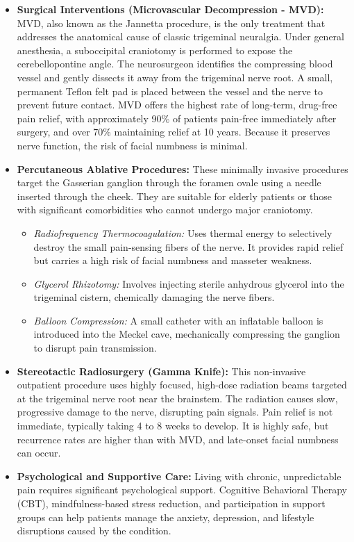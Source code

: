 \begin{itemize}
  \item \textbf{Surgical Interventions (Microvascular Decompression - MVD):}
  MVD, also known as the Jannetta procedure, is the only treatment that addresses the anatomical cause of classic trigeminal neuralgia. Under general anesthesia, a suboccipital craniotomy is performed to expose the cerebellopontine angle. The neurosurgeon identifies the compressing blood vessel and gently dissects it away from the trigeminal nerve root. A small, permanent Teflon felt pad is placed between the vessel and the nerve to prevent future contact. MVD offers the highest rate of long-term, drug-free pain relief, with approximately 90\% of patients pain-free immediately after surgery, and over 70\% maintaining relief at 10 years. Because it preserves nerve function, the risk of facial numbness is minimal.
  \item \textbf{Percutaneous Ablative Procedures:}
  These minimally invasive procedures target the Gasserian ganglion through the foramen ovale using a needle inserted through the cheek. They are suitable for elderly patients or those with significant comorbidities who cannot undergo major craniotomy.
  \begin{itemize}
    \item \textit{Radiofrequency Thermocoagulation:} Uses thermal energy to selectively destroy the small pain-sensing fibers of the nerve. It provides rapid relief but carries a high risk of facial numbness and masseter weakness.
    \item \textit{Glycerol Rhizotomy:} Involves injecting sterile anhydrous glycerol into the trigeminal cistern, chemically damaging the nerve fibers.
    \item \textit{Balloon Compression:} A small catheter with an inflatable balloon is introduced into the Meckel cave, mechanically compressing the ganglion to disrupt pain transmission.
  \end{itemize}
  \item \textbf{Stereotactic Radiosurgery (Gamma Knife):}
  This non-invasive outpatient procedure uses highly focused, high-dose radiation beams targeted at the trigeminal nerve root near the brainstem. The radiation causes slow, progressive damage to the nerve, disrupting pain signals. Pain relief is not immediate, typically taking 4 to 8 weeks to develop. It is highly safe, but recurrence rates are higher than with MVD, and late-onset facial numbness can occur.
  \item \textbf{Psychological and Supportive Care:}
  Living with chronic, unpredictable pain requires significant psychological support. Cognitive Behavioral Therapy (CBT), mindfulness-based stress reduction, and participation in support groups can help patients manage the anxiety, depression, and lifestyle disruptions caused by the condition.
\end{itemize}

